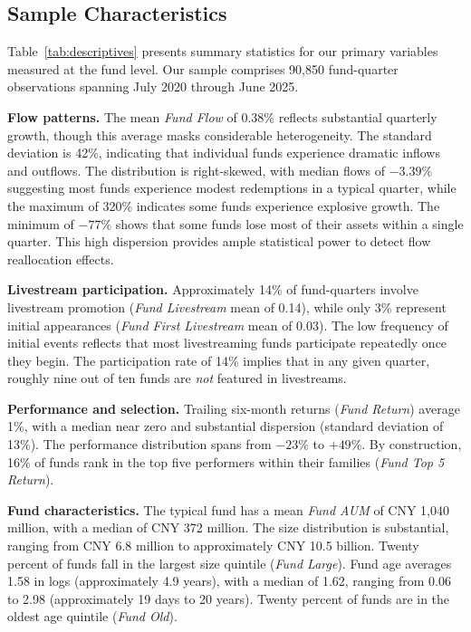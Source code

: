 \documentclass[12pt]{article}
\begin{document}
\subsection{Sample Characteristics}\label{subsec:class_descriptives}

Table~\ref{tab:descriptives} presents summary statistics for our primary variables measured at the fund level. Our sample comprises 90,850 fund-quarter observations spanning July 2020 through June 2025.

\textbf{Flow patterns.} The mean \textit{Fund Flow} of 0.38\% reflects substantial quarterly growth, though this average masks considerable heterogeneity. The standard deviation is 42\%, indicating that individual funds experience dramatic inflows and outflows. The distribution is right-skewed, with median flows of $-3.39\%$ suggesting most funds experience modest redemptions in a typical quarter, while the maximum of 320\% indicates some funds experience explosive growth. The minimum of $-77\%$ shows that some funds lose most of their assets within a single quarter. This high dispersion provides ample statistical power to detect flow reallocation effects.

\textbf{Livestream participation.} Approximately 14\% of fund-quarters involve livestream promotion (\textit{Fund Livestream} mean of 0.14), while only 3\% represent initial appearances (\textit{Fund First Livestream} mean of 0.03). The low frequency of initial events reflects that most livestreaming funds participate repeatedly once they begin. The participation rate of 14\% implies that in any given quarter, roughly nine out of ten funds are \emph{not} featured in livestreams.

\textbf{Performance and selection.} Trailing six-month returns (\textit{Fund Return}) average 1\%, with a median near zero and substantial dispersion (standard deviation of 13\%). The performance distribution spans from $-23\%$ to $+49\%$. By construction, 16\% of funds rank in the top five performers within their families (\textit{Fund Top 5 Return}).

\textbf{Fund characteristics.} The typical fund has a mean \textit{Fund AUM} of CNY 1,040 million, with a median of CNY 372 million. The size distribution is substantial, ranging from CNY 6.8 million to approximately CNY 10.5 billion. Twenty percent of funds fall in the largest size quintile (\textit{Fund Large}). Fund age averages 1.58 in logs (approximately 4.9 years), with a median of 1.62, ranging from 0.06 to 2.98 (approximately 19 days to 20 years). Twenty percent of funds are in the oldest age quintile (\textit{Fund Old}).
\end{document}

